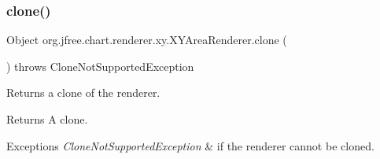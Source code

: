 \subsubsection{\texorpdfstring{clone()}{clone()}}
{\footnotesize\ttfamily Object org.\+jfree.\+chart.\+renderer.\+xy.\+X\+Y\+Area\+Renderer.\+clone (\begin{DoxyParamCaption}{ }\end{DoxyParamCaption}) throws Clone\+Not\+Supported\+Exception}

Returns a clone of the renderer.

\begin{DoxyReturn}{Returns}
A clone.
\end{DoxyReturn}

\begin{DoxyExceptions}{Exceptions}
{\em Clone\+Not\+Supported\+Exception} & if the renderer cannot be cloned. \\
\hline
\end{DoxyExceptions}
\mbox{\label{classorg_1_1jfree_1_1chart_1_1renderer_1_1xy_1_1_x_y_area_renderer_aeb2341f860de5cfeec32e3955bf95667}} 

